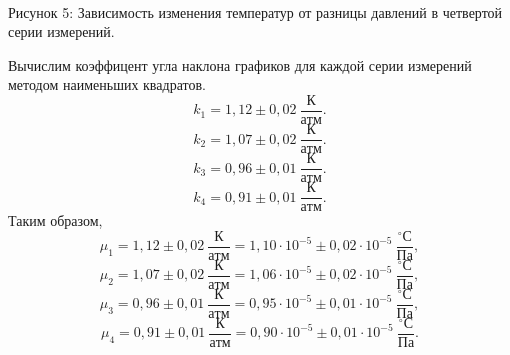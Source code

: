 \documentclass[a4paper,11pt]{article}
\begin{document}
\begin{center}
\\
Рисунок 5: Зависимость изменения температур от разницы давлений в четвертой серии измерений.\\
\end{center}
Вычислим коэффицент угла наклона графиков для каждой серии измерений методом наименьших квадратов.
$$k_{1} = 1,12 \pm 0,02\ \frac{К}{атм}.$$
$$k_{2} = 1,07 \pm 0,02\ \frac{К}{атм}.$$
$$k_{3} = 0,96 \pm 0,01\ \frac{К}{атм}.$$
$$k_{4} = 0,91 \pm 0,01\ \frac{К}{атм}.$$
Таким образом,
$$\mu_{1} = 1,12 \pm 0,02\ \frac{К}{атм} = 1,10 \cdot 10^{-5} \pm 0,02 \cdot 10^{-5}\ \frac{^{\circ}С}{Па},$$
$$\mu_{2} = 1,07 \pm 0,02\ \frac{К}{атм} = 1,06 \cdot 10^{-5} \pm 0,02 \cdot 10^{-5}\ \frac{^{\circ}С}{Па},$$
$$\mu_{3} = 0,96 \pm 0,01\ \frac{К}{атм} = 0,95 \cdot 10^{-5} \pm 0,01 \cdot 10^{-5}\ \frac{^{\circ}С}{Па},$$
$$\mu_{4} = 0,91 \pm 0,01\ \frac{К}{атм} = 0,90 \cdot 10^{-5} \pm 0,01 \cdot 10^{-5}\ \frac{^{\circ}С}{Па}.$$
\end{document}
